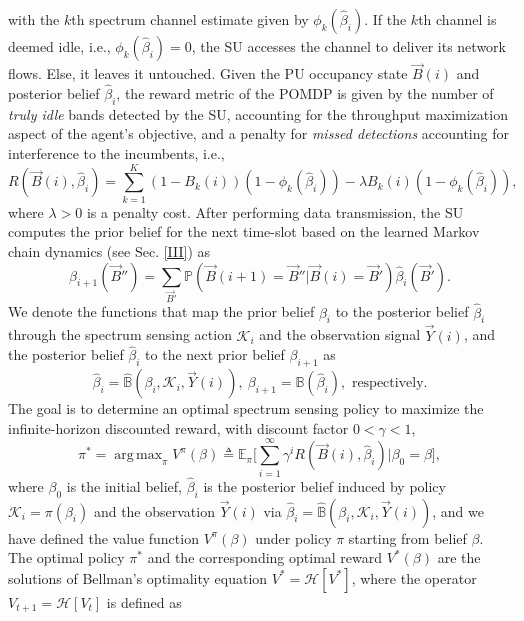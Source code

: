 \documentclass[10pt,twocolumn]{IEEEtran}
\DeclareMathOperator*{\argmax}{arg\,max}
\begin{document}
with the $k$th spectrum channel estimate given by $\phi_k(\hat{\beta}_{i})$. If  the $k$th channel is deemed idle, i.e., $\phi_{k}(\hat{\beta}_{i}){=}0$, the SU accesses the channel to deliver its network flows. Else, it leaves it untouched. Given the PU occupancy state $\vec{B}(i)$ and posterior belief $\hat\beta_i$, the reward metric of the POMDP is given by the number of \emph{truly idle} bands detected by the SU, accounting for the throughput maximization aspect of the agent's objective, and a penalty for \emph{missed detections} accounting for interference to the incumbents, i.e.,
\begin{equation}
\nonumber
    R(\vec{B}(i), \hat{\beta}_i){=}\sum_{k=1}^{K} (1{-}B_k(i))(1{-}\phi_k(\hat{\beta}_{i})){-}\lambda B_k(i)(1 - \phi_k(\hat{\beta}_i)),
\end{equation}
where $\lambda{>}0$ is a penalty cost. After performing data transmission, the SU computes the prior belief for the next time-slot based on the learned Markov chain dynamics
(see Sec. \ref{III}) as
\begin{equation}\label{13}
    \beta_{i+1}(\vec{B}'')=\sum_{\vec{B}'}\mathbb{P}(\vec{B}(i+1) = \vec{B}''|\vec{B}(i)=\vec{B}')\hat{\beta}_{i}(\vec{B}').
\end{equation}
We denote the functions that map the prior belief $\beta_i$ to the posterior belief $\hat\beta_i$ through the spectrum sensing action $\mathcal K_i$ and the observation signal $\vec{Y}(i)$, and the posterior belief $\hat\beta_i$ to the next prior belief $\beta_{i+1}$ as
$$\hat\beta_i{=}\hat{\mathbb B}(\beta_i, \mathcal K_i, \vec{Y}(i)),\ \beta_{i+1}{=}{\mathbb B}(\hat\beta_i),\text{ respectively}.$$
The goal is to determine an optimal spectrum sensing policy to maximize the infinite-horizon discounted reward, with discount factor $0{<}\gamma{<}1$,
\begin{equation}\label{14}
    \pi^{*}{=}\argmax_{\pi} V^{\pi}(\beta) \triangleq \mathbb{E}_{\pi} \Big[\sum_{i=1}^{\infty} \gamma^{i} R(\vec{B}(i), \hat{\beta}_i)|\beta_0 {=}\beta\Big],
\end{equation}
where $\beta_0$ is the initial belief, $\hat\beta_i$ is the posterior belief induced by policy $\mathcal K_i{=}\pi(\beta_i)$ and the observation $\vec{Y}(i)$ via $\hat\beta_i{=}\hat{\mathbb B}(\beta_i, \mathcal K_i, \vec{Y}(i))$, and we have defined the value function $V^{\pi}(\beta)$ under policy $\pi$ starting from belief $\beta$.
The optimal policy $\pi^*$ and the corresponding optimal reward $V^*(\beta)$ are the solutions of Bellman's optimality equation $V^*{=}\mathcal{H}[V^*]$, where the operator $V_{t+1}{=}\mathcal {H}[V_{t}]$ is defined as
\end{document}
